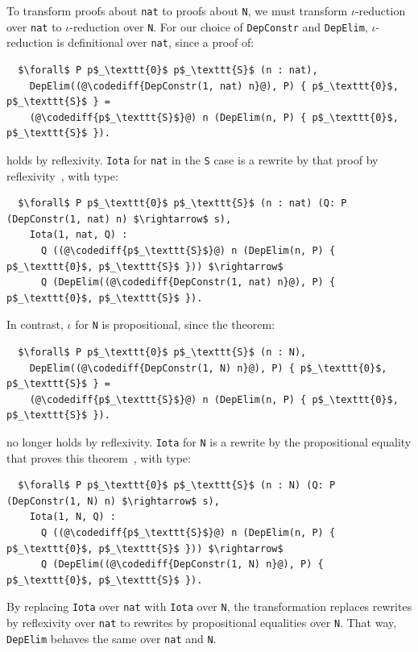 To transform proofs about \lstinline{nat} to proofs about \lstinline{N}, we must transform  $\iota$-reduction over \lstinline{nat} to 
 $\iota$-reduction over \lstinline{N}.
For our choice of \lstinline{DepConstr} and \lstinline{DepElim},
$\iota$-reduction is definitional over \lstinline{nat}, since a proof of:

\begin{lstlisting}
  $\forall$ P p$_\texttt{0}$ p$_\texttt{S}$ (n : nat),
    DepElim((@\codediff{DepConstr(1, nat) n}@), P) { p$_\texttt{0}$, p$_\texttt{S}$ } =
    (@\codediff{p$_\texttt{S}$}@) n (DepElim(n, P) { p$_\texttt{0}$, p$_\texttt{S}$ }).
\end{lstlisting}
holds by reflexivity.
\lstinline{Iota} for \lstinline{nat} in the \lstinline{S} case is a rewrite by that proof by reflexivity~\href{https://github.com/uwplse/pumpkin-pi/blob/v2.0.0/plugin/coq/nonorn.v}{},
with type:

\begin{lstlisting}
  $\forall$ P p$_\texttt{0}$ p$_\texttt{S}$ (n : nat) (Q: P (DepConstr(1, nat) n) $\rightarrow$ s),
    Iota(1, nat, Q) :
      Q ((@\codediff{p$_\texttt{S}$}@) n (DepElim(n, P) { p$_\texttt{0}$, p$_\texttt{S}$ })) $\rightarrow$
      Q (DepElim((@\codediff{DepConstr(1, nat) n}@), P) { p$_\texttt{0}$, p$_\texttt{S}$ }).
\end{lstlisting}
In contrast, $\iota$ for \lstinline{N} is propositional, since the 
theorem: %

\begin{lstlisting}
  $\forall$ P p$_\texttt{0}$ p$_\texttt{S}$ (n : N),
    DepElim((@\codediff{DepConstr(1, N) n}@), P) { p$_\texttt{0}$, p$_\texttt{S}$ } =
    (@\codediff{p$_\texttt{S}$}@) n (DepElim(n, P) { p$_\texttt{0}$, p$_\texttt{S}$ }).
\end{lstlisting}
no longer holds by reflexivity.
\lstinline{Iota} for \lstinline{N} is a rewrite by the propositional equality that proves this theorem~\href{https://github.com/uwplse/pumpkin-pi/blob/v2.0.0/plugin/coq/nonorn.v}{},
with type:

\begin{lstlisting}
  $\forall$ P p$_\texttt{0}$ p$_\texttt{S}$ (n : N) (Q: P (DepConstr(1, N) n) $\rightarrow$ s),
    Iota(1, N, Q) :
      Q ((@\codediff{p$_\texttt{S}$}@) n (DepElim(n, P) { p$_\texttt{0}$, p$_\texttt{S}$ })) $\rightarrow$
      Q (DepElim((@\codediff{DepConstr(1, N) n}@), P) { p$_\texttt{0}$, p$_\texttt{S}$ }).
\end{lstlisting}
By replacing \lstinline{Iota} over \lstinline{nat} with \lstinline{Iota} over \lstinline{N},
the transformation replaces rewrites by reflexivity over \lstinline{nat} to rewrites by propositional equalities over \lstinline{N}.
That way, \lstinline{DepElim} behaves the same over \lstinline{nat} and \lstinline{N}.

